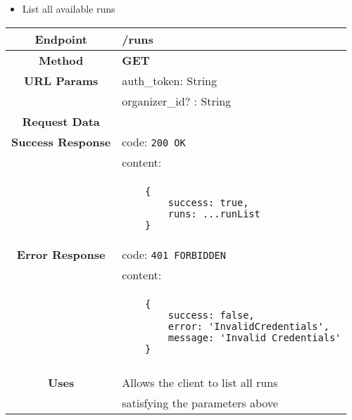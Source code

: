     \begin{itemize}
            \item List all available runs
        \end{itemize}
        \begin{adjustwidth}{1cm}{}
            \begin{longtable}{|c|l|}
                \hline
                \textbf{Endpoint} & /runs \\
                \hline
                \textbf{Method} & \textbf{GET} \\
                \hline
                \textbf{URL Params} &  auth\_token:  String \\
                &                      organizer\_id? : String\\
                \hline
                \textbf{Request Data} &  \\
                \hline
                \textbf{Success Response} & code: \texttt{200 OK} \\
                &                           content: \\
                & \begin{minipage}[t]{0.5\textwidth}
                    \begin{adjustwidth}{1.5cm}{}
                    \begin{verbatim}
    {
        success: true, 
        runs: ...runList
    }
                    \end{verbatim}
                    \end{adjustwidth}
                  \end{minipage} \\
                  \hline
                \textbf{Error Response} &  code: \texttt{401 FORBIDDEN} \\
                &                         content: \\
                & \begin{minipage}[t]{0.7\textwidth}
                    \begin{adjustwidth}{1.5cm}{}
                    \begin{verbatim}
    {
        success: false, 
        error: 'InvalidCredentials',
        message: 'Invalid Credentials'
    }
                    \end{verbatim}
                    \end{adjustwidth}
                  \end{minipage} \\\\
                  \hline
                \textbf{Uses} & Allows the client to list all runs\\ 
                              &  satisfying the parameters above \\
                \hline
            \end{longtable}
        \end{adjustwidth}
    

